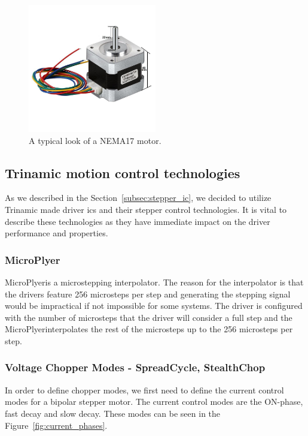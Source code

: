 \begin{figure}[H]
    \centering
    \includegraphics[width=0.5\textwidth]{obrazky/nema17}
    \caption{A typical look of a NEMA17 motor.}
    \label{fig:nema17}
\end{figure}

\subsection{Trinamic motion control technologies}
\label{subsec:trinamic_tech}
As we described in the Section~\ref{subsec:stepper_ic}, we decided to utilize Trinamic made driver \acs{ic}s and their stepper control technologies.
It is vital to describe these technologies as they have immediate impact on the driver performance and properties.

\subsubsection{MicroPlyer\texttrademark}
MicroPlyer\texttrademark is a microstepping interpolator.
The reason for the interpolator is that the drivers feature 256 microsteps per step and generating the stepping signal would be impractical if not impossible for some systems.
The driver is configured with the number of microsteps that the driver will consider a full step and the MicroPlyer\texttrademark interpolates the rest of the microsteps up to the 256 microsteps per step\cite{trinamic_microstepping_nodate}.

\subsubsection{Voltage Chopper Modes - SpreadCycle\texttrademark, StealthChop\texttrademark}
In order to define chopper modes, we first need to define the current control modes for a bipolar stepper motor.
The current control modes are the ON-phase, fast decay and slow decay.
These modes can be seen in the Figure~\ref{fig:current_phases}.


